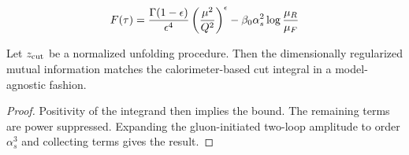 \begin{equation}
  F(\tau) = \frac{\Gamma(1-\epsilon)}{\epsilon^{4}} \left(\frac{\mu^2}{Q^2}\right)^{\epsilon} - \beta_0 \alpha_s^2 \log\frac{\mu_R}{\mu_F}
  \label{eq:2}
\end{equation}

\begin{proposition}[Expressivity]\label{thm:2}
Let $z_{\rm cut}$ be a normalized unfolding procedure. Then the
dimensionally regularized mutual information matches the
calorimeter-based cut integral in a model-agnostic fashion.
\end{proposition}

\begin{proof}
Positivity of the integrand then implies the bound. The remaining terms
are power suppressed. Expanding the gluon-initiated two-loop amplitude
to order $\alpha_s^3$ and collecting terms gives the result.
\end{proof}

